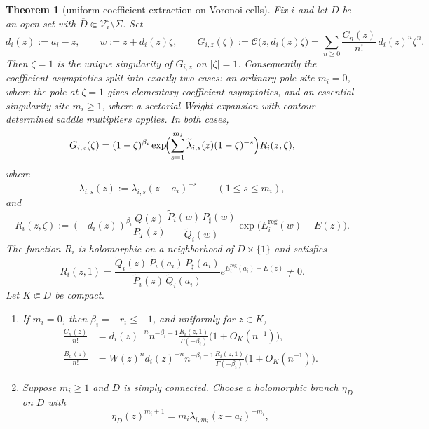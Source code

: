 \documentclass[reqno]{article}
\newtheorem{theorem}{Theorem}
\theoremstyle{definition}
\theoremstyle{remark}
\theoremstyle{plain}
\begin{document}
\begin{theorem}[uniform coefficient extraction on Voronoi cells]\label{prop:local-coef-unified}
Fix $i$ and let $D$ be an open set with \(\overline D\Subset\mathcal V_i^\circ\setminus\Sigma\). Set
$$d_i(z):=a_i-z,\qquad w:=z+d_i(z)\zeta,\qquad
G_{i,z}(\zeta):=\mathcal C\bigl(z,d_i(z)\zeta\bigr)=\sum_{n\ge0}\frac{C_n(z)}{n!}\,d_i(z)^n\zeta^n.$$
Then $\zeta=1$ is the unique singularity of $G_{i,z}$ on $|\zeta|=1$. Consequently the coefficient asymptotics split into exactly two cases: an ordinary pole site $m_i=0$, where the pole at $\zeta=1$ gives elementary coefficient asymptotics, and an essential singularity site $m_i\ge1$, where a sectorial Wright expansion with contour-determined saddle multipliers applies. In both cases,
\begin{equation}\label{eq:Gi-local-unified}
G_{i,z}(\zeta)
=
(1-\zeta)^{\beta_i}
\exp\!\Bigl(\sum_{s=1}^{m_i}\widetilde\lambda_{i,s}(z)(1-\zeta)^{-s}\Bigr)
R_i(z,\zeta),
\end{equation}
where
$$\widetilde\lambda_{i,s}(z):=\lambda_{i,s}(z-a_i)^{-s}\qquad(1\le s\le m_i),$$
and
\begin{equation}\label{eq:Ri-local-unified}
R_i(z,\zeta):=
(-d_i(z))^{\beta_i}\frac{Q(z)}{P_T(z)}
\frac{\widetilde P_i(w)\,P_\sharp(w)}{\widetilde Q_i(w)}
\exp\!\bigl(E_i^{\mathrm{reg}}(w)-E(z)\bigr).
\end{equation}
The function $R_i$ is holomorphic on a neighborhood of $D\times\{1\}$ and satisfies
\begin{equation}\label{eq:Ri-local-unified-at1}
R_i(z,1)=
\frac{\widetilde Q_i(z)\,\widetilde P_i(a_i)\,P_\sharp(a_i)}{\widetilde P_i(z)\,\widetilde Q_i(a_i)}
e^{E_i^{\mathrm{reg}}(a_i)-E(z)}\ne0.
\end{equation}
Let $K\Subset D$ be compact.
\begin{enumerate}
\item If $m_i=0$, then $\beta_i=-r_i\le-1$, and uniformly for $z\in K$,
\begin{align}
\frac{C_n(z)}{n!}
&=d_i(z)^{-n}n^{-\beta_i-1}\frac{R_i(z,1)}{\Gamma(-\beta_i)}\bigl(1+O_K(n^{-1})\bigr),\label{eq:Cn-local-unified-pole}\\
\frac{B_n(z)}{n!}
&=W(z)^n d_i(z)^{-n}n^{-\beta_i-1}\frac{R_i(z,1)}{\Gamma(-\beta_i)}\bigl(1+O_K(n^{-1})\bigr).\label{eq:Bn-local-unified-pole}
\end{align}
\item Suppose $m_i\ge1$ and $D$ is simply connected. Choose a holomorphic branch $\eta_D$ on $D$ with
$$\eta_D(z)^{m_i+1}=m_i\lambda_{i,m_i}(z-a_i)^{-m_i},$$

\end{enumerate}
\end{theorem}
\end{document}
